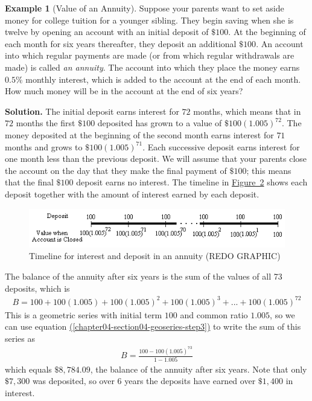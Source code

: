 \documentclass[10pt,]{book}
\theoremstyle{plain}
\theoremstyle{definition}
\theoremstyle{definition}
\newtheorem{example}[theorem]{Example}
\theoremstyle{definition}
\numberwithin{equation}{section}
\begin{document}
\begin{example}[Value of an Annuity]\label{value-on-an-annuity}
\hypertarget{p-152}{}%
Suppose your parents want to set aside money for college tuition for a younger sibling.  They begin saving when she is twelve by opening an account with an initial deposit of \(\$100\).  At the beginning of each month for six years thereafter, they deposit an additional \(\$100\).  An account into which regular payments are made (or from which regular withdrawals are made) is called \emph{an annuity}.  The account into which they place the money earns \(0.5\%\) monthly interest, which is added to the account at the end of each month.  How much money will be in the account at the end of six years?%
\par\smallskip%
\noindent\textbf{Solution.}\hypertarget{solution-11}{}\quad%
\hypertarget{p-153}{}%
The initial deposit earns interest for \(72\) months, which means that in \(72\) months the first \(\$100\) deposited has grown to a value of \(\$100(1.005)^{72}\).  The money deposited at the beginning of the second month earns interest for \(71\) months and grows to \(\$100(1.005)^{71}\).  Each successive deposit earns interest for one month less than the previous deposit.  We will assume that your parents close the account on the day that they make the final payment of \(\$100\); this means that the final \(\$100\) deposit earns no interest.  The timeline in \hyperref[deposit-timeline]{Figure~2} shows each deposit together with the amount of interest earned by each deposit.%
\begin{figure}
\centering
\includegraphics[width=0.8\linewidth]{src/images/chapter04-section04-depositchart.png}
\caption{Timeline for interest and deposit in an annuity (REDO GRAPHIC)\label{deposit-timeline}}
\end{figure}
\hypertarget{p-154}{}%
The balance of the annuity after six years is the sum of the values of all 73 deposits, which is%
\begin{gather*}
B = 100 + 100(1.005) + 100(1.005)^2 + 100(1.005)^3 + ... + 100(1.005)^{72}
\end{gather*}
This is a geometric series with initial term \(100\) and common ratio \(1.005\), so we can use equation \hyperref[chapter04-section04-geoseries-step3]{(\ref{chapter04-section04-geoseries-step3})} to write the sum of this series as%
\begin{gather}
B= \frac{100-100(1.005)^{73}}{1-1.005}\label{mrow-80}
\end{gather}
which equals \(\$8,784.09\), the balance of the annuity after six years.  Note that only \(\$7,300\) was deposited, so over \(6\) years the deposits have earned over \(\$1,400\) in interest.%
\end{example}
\end{document}
